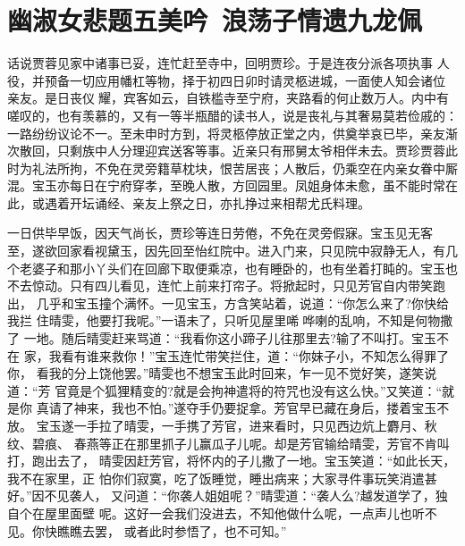 \chapter{幽淑女悲题五美吟~浪荡子情遗九龙佩}

话说贾蓉见家中诸事已妥，连忙赶至寺中，回明贾珍。于是连夜分派各项执事
人役，并预备一切应用幡杠等物，择于初四日卯时请灵柩进城，一面使人知会诸位
亲友。是日丧仪耀，宾客如云，自铁槛寺至宁府，夹路看的何止数万人。内中有
嗟叹的，也有羡慕的，又有一等半瓶醋的读书人，说是丧礼与其奢易莫若俭戚的：
一路纷纷议论不一。至未申时方到，将灵柩停放正堂之内，供奠举哀已毕，亲友渐
次散回，只剩族中人分理迎宾送客等事。近亲只有邢舅太爷相伴未去。贾珍贾蓉此
时为礼法所拘，不免在灵旁籍草枕块，恨苦居丧；人散后，仍乘空在内亲女眷中厮
混。宝玉亦每日在宁府穿孝，至晚人散，方回园里。凤姐身体未愈，虽不能时常在
此，或遇着开坛诵经、亲友上祭之日，亦扎挣过来相帮尤氏料理。

一日供毕早饭，因天气尚长，贾珍等连日劳倦，不免在灵旁假寐。宝玉见无客
至，遂欲回家看视黛玉，因先回至怡红院中。进入门来，只见院中寂静无人，有几
个老婆子和那小丫头们在回廊下取便乘凉，也有睡卧的，也有坐着打盹的。宝玉也
不去惊动。只有四儿看见，连忙上前来打帘子。将掀起时，只见芳官自内带笑跑出，
几乎和宝玉撞个满怀。一见宝玉，方含笑站着，说道：“你怎么来了?你快给我拦
住晴雯，他要打我呢。”一语未了，只听见屋里唏哗喇的乱响，不知是何物撒了
一地。随后晴雯赶来骂道：“我看你这小蹄子儿往那里去?输了不叫打。宝玉不在
家，我看有谁来救你！”宝玉连忙带笑拦住，道：“你妹子小，不知怎么得罪了你，
看我的分上饶他罢。”晴雯也不想宝玉此时回来，乍一见不觉好笑，遂笑说道：“芳
官竟是个狐狸精变的?就是会拘神遣将的符咒也没有这么快。”又笑道：“就是你
真请了神来，我也不怕。”遂夺手仍要捉拿。芳官早已藏在身后，搂着宝玉不放。
宝玉遂一手拉了晴雯，一手携了芳官，进来看时，只见西边炕上麝月、秋纹、碧痕、
春燕等正在那里抓子儿赢瓜子儿呢。却是芳官输给晴雯，芳官不肯叫打，跑出去了，
晴雯因赶芳官，将怀内的子儿撒了一地。宝玉笑道：“如此长天，我不在家里，正
怕你们寂寞，吃了饭睡觉，睡出病来；大家寻件事玩笑消遣甚好。”因不见袭人，
又问道：“你袭人姐姐呢？”晴雯道：“袭人么?越发道学了，独自个在屋里面壁
呢。这好一会我们没进去，不知他做什么呢，一点声儿也听不见。你快瞧瞧去罢，
或者此时参悟了，也不可知。”

